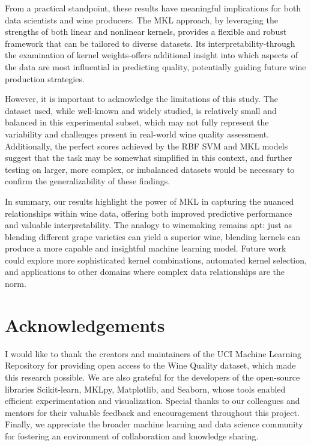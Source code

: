 \documentclass[11pt]{article}
\begin{document}
From a practical standpoint, these results have meaningful implications for both data scientists and wine producers. The MKL approach, by leveraging the strengths of both linear and nonlinear kernels, provides a flexible and robust framework that can be tailored to diverse datasets. Its interpretability-through the examination of kernel weights-offers additional insight into which aspects of the data are most influential in predicting quality, potentially guiding future wine production strategies.

However, it is important to acknowledge the limitations of this study. The dataset used, while well-known and widely studied, is relatively small and balanced in this experimental subset, which may not fully represent the variability and challenges present in real-world wine quality assessment. Additionally, the perfect scores achieved by the RBF SVM and MKL models suggest that the task may be somewhat simplified in this context, and further testing on larger, more complex, or imbalanced datasets would be necessary to confirm the generalizability of these findings.

In summary, our results highlight the power of MKL in capturing the nuanced relationships within wine data, offering both improved predictive performance and valuable interpretability. The analogy to winemaking remains apt: just as blending different grape varieties can yield a superior wine, blending kernels can produce a more capable and insightful machine learning model. Future work could explore more sophisticated kernel combinations, automated kernel selection, and applications to other domains where complex data relationships are the norm.

\section{Acknowledgements}

I would like to thank the creators and maintainers of the UCI Machine Learning Repository for providing open access to the Wine Quality dataset, which made this research possible. We are also grateful for the developers of the open-source libraries Scikit-learn, MKLpy, Matplotlib, and Seaborn, whose tools enabled efficient experimentation and visualization. Special thanks to our colleagues and mentors for their valuable feedback and encouragement throughout this project. Finally, we appreciate the broader machine learning and data science community for fostering an environment of collaboration and knowledge sharing.
\end{document}
